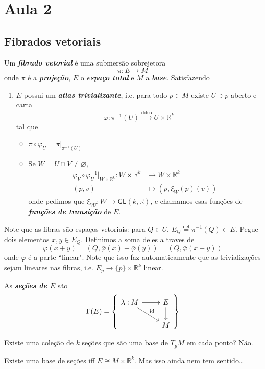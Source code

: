 \section{Aula 2}

\subsection{Fibrados vetoriais}

\begin{defn}\leavevmode
Um \textit{\textbf{fibrado vetorial}} é uma submersão sobrejetora
\[\pi:E \to M\]
onde \(\pi\) é a \textit{\textbf{projeção}},  \(E\) o \textit{\textbf{espaço total}} e \(M\) a \textit{\textbf{base}}. Satisfazendo
\begin{enumerate}
\item \(E\) possui um \textit{\textbf{atlas trivializante}}, i.e. para todo \(p \in M\) existe \(U \ni p\) aberto e carta
		\[\varphi: \pi^{-1}(U) \overset{\operatorname{difeo}}{\to} U \times \mathbb{R}^k\]
		tal que
	\begin{itemize}
	\item \(\pi \circ \varphi_U = \pi|_{\pi^{-1}(U)}\) 
	\item Se \(W=U \cap V \neq  \varnothing\), 
		\begin{align*}
			\varphi_V \circ \varphi_U^{-1} |_{W \times \mathbb{R}^k}: W \times \mathbb{R}^k &\longrightarrow W \times \mathbb{R}^k \\
			(p,v) &\longmapsto (p,\xi_W(p)(v))
		\end{align*}
	onde pedimos que \(\xi_{VU}:W \to \mathsf{GL}(k,\mathbb{R})\), e chamamos esas funções de \textit{\textbf{funções de transição}} de \(E\).
	\end{itemize}
\end{enumerate}
\end{defn}
Note que as fibras são espaços vetoriais: para \(Q \in U\), \(E_Q\overset{\operatorname{def}}{=}\pi^{-1}(Q) \subset E\). Pegue dois elementos \(x, y \in E_Q\). Definimos a soma deles a traves de
\[\varphi(x+y)=(Q,\bar{\varphi} (x)+\bar{\varphi} (y))=(Q,\bar{\varphi} (x+y))\]
onde \(\bar{\varphi} \) é a parte ``linear". Note que isso faz automaticamente que as trivializações sejam lineares nas fibras, i.e. \(E_p \to \{p\}\times \mathbb{R}^k\) linear.

\begin{defn}\leavevmode
As \textit{\textbf{seções de \(E\)}} são
\[\Gamma(E)= \left\{ \begin{tikzcd}\lambda:M\arrow[r]\arrow[rd,"\operatorname{id}"]&  E \arrow[d]\\& M\end{tikzcd} \right\} \]
\end{defn}
\begin{question}\leavevmode
Existe uma coleção de \(k\) seções que são uma base de \(T_pM\) em cada ponto? Não.
\end{question}
\begin{remark}\leavevmode
Existe uma base de seções iff \(E \cong M \times \mathbb{R}^k\). Mas isso ainda nem tem sentido…
\end{remark}

